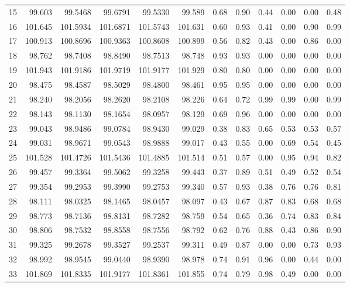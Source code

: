\begin{table}[p]
\begin{tabular}{@{}rrrrrr|rr|rrrr@{}}
15 & 99.603 & 99.5468 & 99.6791 & 99.5330 & 99.589 & 0.68 & 0.90 & 0.44 & 0.00 & 0.00 & 0.48 \\
16 & 101.645 & 101.5934 & 101.6871 & 101.5743 & 101.631 & 0.60 & 0.93 & 0.41 & 0.00 & 0.90 & 0.99 \\
17 & 100.913 & 100.8696 & 100.9363 & 100.8608 & 100.899 & 0.56 & 0.82 & 0.43 & 0.00 & 0.86 & 0.00 \\
18 & 98.762 & 98.7408 & 98.8490 & 98.7513 & 98.748 & 0.93 & 0.93 & 0.00 & 0.00 & 0.00 & 0.00 \\
19 & 101.943 & 101.9186 & 101.9719 & 101.9177 & 101.929 & 0.80 & 0.80 & 0.00 & 0.00 & 0.00 & 0.00 \\
20 & 98.475 & 98.4587 & 98.5029 & 98.4800 & 98.461 & 0.95 & 0.95 & 0.00 & 0.00 & 0.00 & 0.00 \\
21 & 98.240 & 98.2056 & 98.2620 & 98.2108 & 98.226 & 0.64 & 0.72 & 0.99 & 0.99 & 0.00 & 0.99 \\
22 & 98.143 & 98.1130 & 98.1654 & 98.0957 & 98.129 & 0.69 & 0.96 & 0.00 & 0.00 & 0.00 & 0.00 \\
23 & 99.043 & 98.9486 & 99.0784 & 98.9430 & 99.029 & 0.38 & 0.83 & 0.65 & 0.53 & 0.53 & 0.57 \\
24 & 99.031 & 98.9671 & 99.0543 & 98.9888 & 99.017 & 0.43 & 0.55 & 0.00 & 0.69 & 0.54 & 0.45 \\
25 & 101.528 & 101.4726 & 101.5436 & 101.4885 & 101.514 & 0.51 & 0.57 & 0.00 & 0.95 & 0.94 & 0.82 \\
26 & 99.457 & 99.3364 & 99.5062 & 99.3258 & 99.443 & 0.37 & 0.89 & 0.51 & 0.49 & 0.52 & 0.54 \\
27 & 99.354 & 99.2953 & 99.3990 & 99.2753 & 99.340 & 0.57 & 0.93 & 0.38 & 0.76 & 0.76 & 0.81 \\
28 & 98.111 & 98.0325 & 98.1465 & 98.0457 & 98.097 & 0.43 & 0.67 & 0.87 & 0.83 & 0.68 & 0.68 \\
29 & 98.773 & 98.7136 & 98.8131 & 98.7282 & 98.759 & 0.54 & 0.65 & 0.36 & 0.74 & 0.83 & 0.84 \\
30 & 98.806 & 98.7532 & 98.8558 & 98.7556 & 98.792 & 0.62 & 0.76 & 0.88 & 0.43 & 0.86 & 0.90 \\
31 & 99.325 & 99.2678 & 99.3527 & 99.2537 & 99.311 & 0.49 & 0.87 & 0.00 & 0.00 & 0.73 & 0.93 \\
32 & 98.992 & 98.9545 & 99.0440 & 98.9390 & 98.978 & 0.74 & 0.91 & 0.96 & 0.00 & 0.44 & 0.00 \\
33 & 101.869 & 101.8335 & 101.9177 & 101.8361 & 101.855 & 0.74 & 0.79 & 0.98 & 0.49 & 0.00 & 0.00 \\

\end{tabular}
\end{table}
